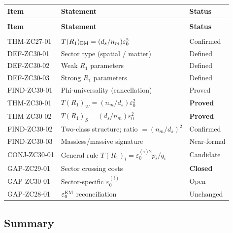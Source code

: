 \documentclass[12pt, a4paper]{article}
\begin{document}
{\small
\setlength{\LTpre}{4pt}
\setlength{\LTpost}{4pt}
\renewcommand{\arraystretch}{1.30}
\begin{longtable}{>{\raggedright\arraybackslash}p{3.0cm}
                  >{\raggedright\arraybackslash}p{7.6cm}
                  >{\centering\arraybackslash}p{1.6cm}}
\toprule
\textbf{Item} & \textbf{Statement} & \textbf{Status} \\
\midrule
\endfirsthead
\multicolumn{3}{l}{\small\textit{(continued)}}\\[4pt]
\toprule
\textbf{Item} & \textbf{Statement} & \textbf{Status} \\
\midrule
\endhead
\midrule
\multicolumn{3}{r}{\small\textit{(continues)}}\\
\endfoot
\bottomrule
\endlastfoot
THM-ZC27-01   & $T(R_1)_{\rm EM}=(d_s/n_m)\varepsilon_0^2$
  & Confirmed \\
\midrule
DEF-ZC30-01   & Sector type (spatial / matter)
  & Defined \\
DEF-ZC30-02   & Weak $R_1$ parameters
  & Defined \\
DEF-ZC30-03   & Strong $R_1$ parameters
  & Defined \\
FIND-ZC30-01  & Phi-universality (cancellation)
  & Proved \\
THM-ZC30-01   & $T(R_1)_W=(n_m/d_s)\varepsilon_0^2$
  & \textbf{Proved} \\
THM-ZC30-02   & $T(R_1)_S=(d_s/n_m)\varepsilon_0^2$
  & \textbf{Proved} \\
FIND-ZC30-02  & Two-class structure; ratio $= (n_m/d_s)^2$
  & Confirmed \\
FIND-ZC30-03  & Massless/massive signature
  & Near-formal \\
CONJ-ZC30-01  & General rule $T(R_1)_i=\varepsilon_0^{(i)2}p_i/q_i$
  & Candidate \\
\midrule
GAP-ZC29-01   & Sector crossing costs
  & \textbf{Closed} \\
GAP-ZC30-01   & Sector-specific $\varepsilon_0^{(i)}$
  & Open \\
GAP-ZC28-01   & $\varepsilon_0^{\rm EM}$ reconciliation
  & Unchanged \\
\end{longtable}
}
\vspace{-6pt}

\subsection{Summary}
\label{zc30:sec:summary}
\end{document}
